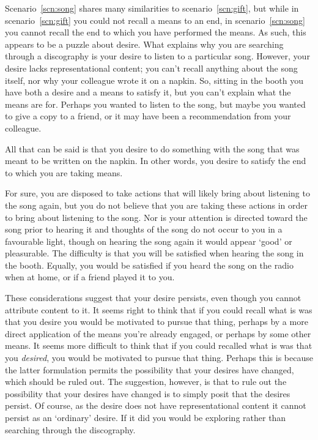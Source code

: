 \documentclass[10pt]{article}
\begin{document}
Scenario~\ref{scn:song} shares many similarities to scenario~\ref{scn:gift}, but while in scenario~\ref{scn:gift} you could not recall a means to an end, in scenario~\ref{scn:song} you cannot recall the end to which you have performed the means.
As such, this appears to be a puzzle about desire.
What explains why you are searching through a discography is your desire to listen to a particular song.
However, your desire lacks representational content; you can't recall anything about the song itself, nor why your colleague wrote it on a napkin.
So, sitting in the booth you have both a desire and a means to satisfy it, but you can't explain what the means are for.
Perhaps you wanted to listen to the song, but maybe you wanted to give a copy to a friend, or it may have been a recommendation from your colleague.

All that can be said is that you desire to do something with the song that was meant to be written on the napkin.
In other words, you desire to satisfy the end to which you are taking means.

For sure, you are disposed to take actions that will likely bring about listening to the song again, but you do not believe that you are taking these actions in order to bring about listening to the song.
Nor is your attention is directed toward the song prior to hearing it and thoughts of the song do not occur to you in a favourable light, though on hearing the song again it would appear `good' or pleasurable.
The difficulty is that you will be satisfied when hearing the song in the booth.
Equally, you would be satisfied if you heard the song on the radio when at home, or if a friend played it to you.

These considerations suggest that your desire persists, even though you cannot attribute content to it.
It seems right to think that if you could recall what is was that you desire you would be motivated to pursue that thing, perhaps by a more direct application of the means you're already engaged, or perhaps by some other means.
It seems more difficult to think that if you could recalled what is was that you \emph{desired}, you would be motivated to pursue that thing.
Perhaps this is because the latter formulation permits the possibility that your desires have changed, which should be ruled out.
The suggestion, however, is that to rule out the possibility that your desires have changed is to simply posit that the desires persist.
Of course, as the desire does not have representational content it cannot persist as an `ordinary' desire.
If it did you would be exploring rather than searching through the discography.
\end{document}
